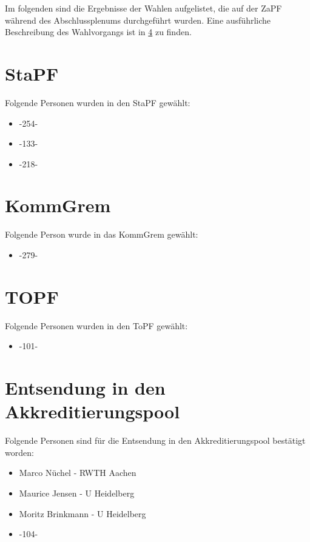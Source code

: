 
Im folgenden sind die Ergebnisse der Wahlen aufgelistet, die auf der ZaPF während des Abschlussplenums durchgeführt wurden.
Eine ausführliche Beschreibung des Wahlvorgangs ist in \ref{} zu finden.

    \section{StaPF}
      Folgende Personen wurden in den StaPF gewählt:
        \begin{itemize}
          \item -254-
          \item -133-
          \item -218-
        \end{itemize}

    \section{KommGrem}
      Folgende Person wurde in das KommGrem gewählt:
      \begin{itemize}
        \item -279-
      \end{itemize}

    \section{TOPF}
      Folgende Personen wurden in den ToPF gewählt:
      \begin{itemize}
        \item -101-
      \end{itemize}


    \section{Entsendung in den Akkreditierungspool}
      Folgende Personen sind für die Entsendung in den Akkreditierungspool bestätigt worden:
      \begin{itemize}
        \item Marco Nüchel - RWTH Aachen
        \item Maurice Jensen - U Heidelberg
        \item Moritz Brinkmann - U Heidelberg
        \item -104-
      \end{itemize}

